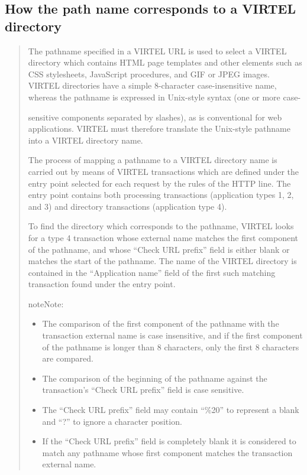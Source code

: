 \documentclass[letterpaper,10pt,english]{sphinxmanual}
\begin{document}
\subsection{How the path name corresponds to a VIRTEL directory}
\label{\detokenize{User_Guide:how-the-path-name-corresponds-to-a-virtel-directory}}\label{\detokenize{User_Guide:v457ug-how-the-path-name}}\begin{quote}

The pathname specified in a VIRTEL URL is used to select a VIRTEL
directory which contains HTML page templates and other elements such
as CSS stylesheets, JavaScript procedures, and GIF or JPEG images.
VIRTEL directories have a simple 8-character case-insensitive name,
whereas the pathname is expressed in Unix-style syntax (one or more
case-

sensitive components separated by slashes), as is conventional for
web applications. VIRTEL must therefore translate the Unix-style
pathname into a VIRTEL directory name.

The process of mapping a pathname to a VIRTEL directory name is
carried out by means of VIRTEL transactions which are defined under
the entry point selected for each request by the rules of the HTTP
line. The entry point contains both processing transactions
(application types 1, 2, and 3) and directory transactions
(application type 4).

To find the directory which corresponds to the pathname, VIRTEL
looks for a type 4 transaction whose external name matches the first
component of the pathname, and whose “Check URL prefix” field is
either blank or matches the start of the pathname. The name of the
VIRTEL directory is contained in the “Application name” field of the
first such matching transaction found under the entry point.

\begin{sphinxadmonition}{note}{Note:}\begin{itemize}
\item {} 
The comparison of the first component of the pathname with the transaction external name is case insensitive, and if the first component of the pathname is longer than 8 characters, only the first 8 characters are compared.

\item {} 
The comparison of the beginning of the pathname against the transaction’s “Check URL prefix” field is case sensitive.

\item {} 
The “Check URL prefix” field may contain “\%20” to represent a blank and “?” to ignore a character position.

\item {} 
If the “Check URL prefix” field is completely blank it is considered to match any pathname whose first component matches the transaction external name.

\end{itemize}
\end{sphinxadmonition}
\end{quote}
\end{document}

